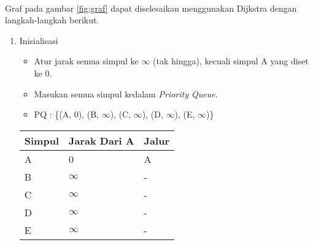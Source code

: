 \\
Graf pada gambar \ref{fig:graf} dapat diselesaikan menggunakan Dijkstra dengan langkah-langkah berikut.
\begin{enumerate}
    \item Inisialisasi
    \begin{itemize}
        \item Atur jarak semua simpul ke $\infty$ (tak hingga), kecuali simpul A yang diset ke 0.
        \item Masukan semua simpul kedalam \textit{Priority Queue}.
        \item PQ : \{(A, 0), (B, $\infty$), (C, $\infty$), (D, $\infty$), (E, $\infty$)\}
    \end{itemize}
    \begin{table}[h]
        \begin{tabular}{|l|l|l|}
        \hline
            \textbf{Simpul} & \textbf{Jarak Dari A} & Jalur \\ \hline
            A               & 0                     & A     \\ \hline
            B               & $\infty$              & -     \\ \hline
            C               & $\infty$              & -     \\ \hline
            D               & $\infty$              & -     \\ \hline
            E               & $\infty$              & -     \\ \hline
        \end{tabular}
    \end{table}
    

\end{enumerate}
